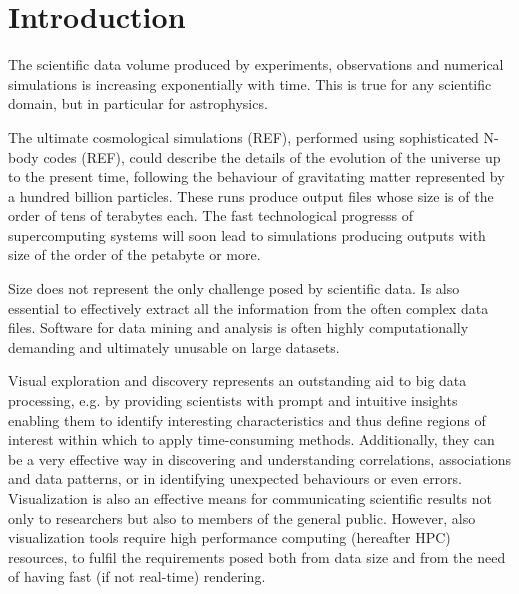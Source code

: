\documentclass[runningheads,a4paper]{llncs}
\newcommand{\comm}[1]{}
\begin{document}
\section{Introduction}
\label{sect:introduction}

The scientific data volume produced by experiments, observations and numerical simulations 
is increasing exponentially with time. This is true for any scientific domain, but in 
particular for astrophysics. 

\comm{Next generations of telescopes and antennas are expected to produce
enormous amount of data. The Square Kilometer Array project (REF), for instance, will 
generate an exabyte of data every day, twice the information currently exchanged on 
the internet on a daily basis and 100 times more information then the CERN LHC (REF) experiment
produces. At the same time, computer simulations represent an invaluable instrument for 
astrophysicists to validate theories and compare to observations through numerical experiments.}

The ultimate cosmological simulations (REF), performed using sophisticated N-body codes (REF), 
could describe the details of the evolution of the universe up to the present time, following the behaviour of 
gravitating matter represented by a hundred billion particles. These runs produce output files 
whose size is of the order of tens of terabytes each. The fast technological progresss 
of supercomputing systems will soon lead to simulations producing outputs with size of the order of 
the petabyte or more. 

Size does not represent the only challenge posed by scientific data. Is also essential to 
effectively extract all the information from the often complex data files. 
Software for data mining and analysis is often highly computationally demanding and 
ultimately unusable on large datasets.  

Visual exploration and discovery represents an outstanding aid to big data processing, 
e.g. by providing scientists with
prompt and intuitive insights enabling them to identify interesting 
characteristics and thus define regions of interest within which to apply time-consuming 
methods. Additionally, they can be a very effective way in discovering and
understanding correlations, associations and data patterns, or in identifying unexpected behaviours
or even errors. Visualization is also an effective means for communicating scientific results not
only to researchers but also to members of the general public.
However, also visualization tools require high performance computing (hereafter HPC) resources, to 
fulfil the requirements posed both from data size and from the need of having
fast (if not real-time) rendering.
\end{document}
